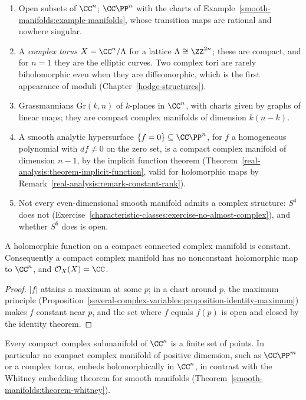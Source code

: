 \begin{example}\label{complex-manifolds:example-complex-manifolds}
\begin{enumerate}
\item Open subsets of $\CC^n$; $\CC\PP^n$ with the charts of Example~\ref{smooth-manifolds:example-manifolds}, whose transition maps are rational and nowhere singular.
\item A \emph{complex torus} $X = \CC^n/\Lambda$ for a lattice $\Lambda \cong \ZZ^{2n}$; these are compact, and for $n = 1$ they are the elliptic curves. Two complex tori are rarely biholomorphic even when
they are diffeomorphic, which is the first appearance of moduli (Chapter~\ref{hodge-structures}).
\item Grassmannians $\mathrm{Gr}(k, n)$ of $k$-planes in $\CC^n$, with charts given by graphs of linear maps; they are compact complex manifolds of dimension $k(n-k)$.
\item A smooth analytic hypersurface $\{f = 0\} \subseteq \CC\PP^n$, for $f$ a homogeneous polynomial with $df \neq 0$ on the zero set, is a compact complex manifold of dimension $n - 1$, by the implicit
function theorem (Theorem~\ref{real-analysis:theorem-implicit-function}, valid for holomorphic maps by Remark~\ref{real-analysis:remark-constant-rank}).
\item Not every even-dimensional smooth manifold admits a complex structure: $S^4$ does not (Exercise~\ref{characteristic-classes:exercise-no-almost-complex}), and whether $S^6$ does is open.
\end{enumerate}
\end{example}

\begin{proposition}\label{complex-manifolds:proposition-no-functions}
A holomorphic function on a compact connected complex manifold is constant. Consequently a compact complex manifold has no nonconstant holomorphic map to $\CC^n$, and $\mathcal{O}_X(X) = \CC$.
\end{proposition}

\begin{proof}
$|f|$ attains a maximum at some $p$; in a chart around $p$, the maximum principle
(Proposition~\ref{several-complex-variables:proposition-identity-maximum}) makes $f$ constant near $p$, and the set where $f$ equals $f(p)$ is open and closed by the identity theorem.
\end{proof}

\begin{corollary}\label{complex-manifolds:corollary-compact-submanifolds}
Every compact complex submanifold of $\CC^n$ is a finite set of points. In particular no compact complex manifold of positive dimension, such as $\CC\PP^m$ or a complex torus, embeds holomorphically in $\CC^n$, in contrast with the
Whitney embedding theorem for smooth manifolds (Theorem~\ref{smooth-manifolds:theorem-whitney}).
\end{corollary}

